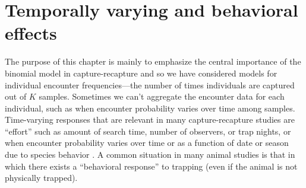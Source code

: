 \section{Temporally varying and behavioral effects}
\label{closed.sec.timebehavefx}

The purpose of this chapter is mainly to emphasize the central
importance of the binomial model in capture-recapture and so we have
considered models for individual encounter frequencies---the number of
times individuals are captured out of $K$ samples.  Sometimes we can't
aggregate the encounter data for each individual, such as when
encounter probability varies over time among samples.  Time-varying
responses that are relevant in many capture-recapture studies are
``effort'' such as amount of search time, number of observers, or trap
nights, or when encounter probability varies over time or as a
function of date or season due to species behavior
\citep{kery_etal:2010}.  A common situation in many animal studies is
that in which there exists a ``behavioral response'' to trapping (even
if the animal is not physically trapped).

